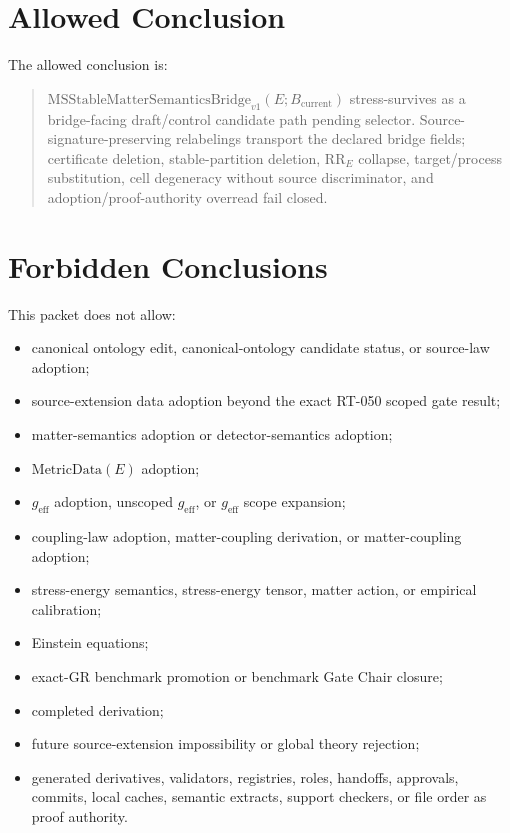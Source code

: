 \documentclass[11pt]{article}
\newcommand{\Bcur}{B_{\mathrm{current}}}
\newcommand{\MSBridge}{\mathrm{MSStableMatterSemanticsBridge}_{v1}}
\newcommand{\MetricData}{\mathrm{MetricData}}
\newcommand{\geff}{g_{\mathrm{eff}}}
\begin{document}
\section{Allowed Conclusion}

The allowed conclusion is:
\begin{quote}
\(\MSBridge(E;\Bcur)\) stress-survives as a bridge-facing draft/control
candidate path pending selector. Source-signature-preserving relabelings
transport the declared bridge fields; certificate deletion, stable-partition
deletion, \(\mathrm{RR}_E\) collapse, target/process substitution, cell
degeneracy without source discriminator, and adoption/proof-authority overread
fail closed.
\end{quote}

\section{Forbidden Conclusions}

This packet does not allow:
\begin{itemize}[leftmargin=*]
  \item canonical ontology edit, canonical-ontology candidate status, or
    source-law adoption;
  \item source-extension data adoption beyond the exact RT-050 scoped gate
    result;
  \item matter-semantics adoption or detector-semantics adoption;
  \item \(\MetricData(E)\) adoption;
  \item \(\geff\) adoption, unscoped \(\geff\), or \(\geff\) scope expansion;
  \item coupling-law adoption, matter-coupling derivation, or
    matter-coupling adoption;
  \item stress-energy semantics, stress-energy tensor, matter action, or
    empirical calibration;
  \item Einstein equations;
  \item exact-GR benchmark promotion or benchmark Gate Chair closure;
  \item completed derivation;
  \item future source-extension impossibility or global theory rejection;
  \item generated derivatives, validators, registries, roles, handoffs,
    approvals, commits, local caches, semantic extracts, support checkers, or
    file order as proof authority.
\end{itemize}
\end{document}
